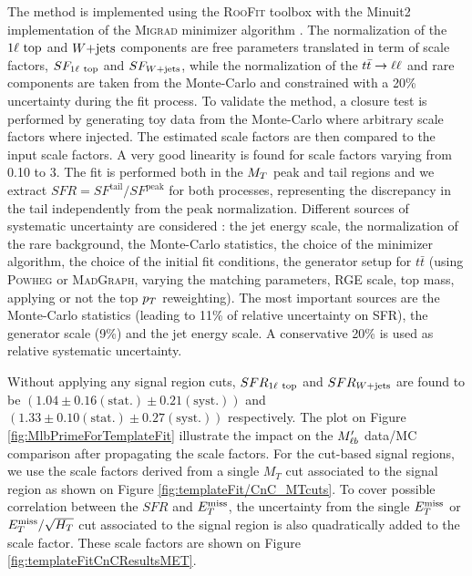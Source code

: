    The method is implemented using the \textsc{RooFit} toolbox  with the Minuit2
    implementation of the \textsc{Migrad} minimizer algorithm . The normalization
    of the $1\ell~\text{top}$ and $\text{$W$+jets}$ components are free parameters translated in term
    of scale factors, $SF_{1\ell~\text{top}}$ and $SF_{\text{$W$+jets}}$, while the normalization of
    the $t\bar{t} \rightarrow \ell \ell$ and rare components are taken from the Monte-Carlo and constrained
    with a 20\% uncertainty during the fit process. To validate the method, a closure test
    is performed by generating toy data from the Monte-Carlo where arbitrary scale factors
    where injected. The estimated scale factors are then compared to the input scale factors.
    A very good linearity is found for scale factors varying from 0.10 to 3. The fit is
    performed both in the $M_T$ peak and tail regions and we extract $SFR = SF^{\text{tail}}
    / SF^{\text{peak}}$ for both processes, representing the discrepancy in the tail
    independently from the peak normalization. Different sources of systematic uncertainty
    are considered : the jet energy scale, the normalization of the rare background, the
    Monte-Carlo statistics, the choice of the minimizer algorithm, the choice of the
    initial fit conditions, the generator setup for $t\bar{t}$ (using \textsc{Powheg} or
    \textsc{MadGraph}, varying the matching parameters, RGE scale, top mass, applying or
    not the top $p_T$ reweighting). The most important sources are the Monte-Carlo statistics
    (leading to 11\% of relative uncertainty on SFR), the generator scale (9\%) and the jet
    energy scale. A conservative 20\% is used as relative systematic uncertainty.

    Without applying any signal region cuts, $SFR_{1\ell~\text{top}}$ and $SFR_{\text{$W$+jets}}$ are found
    to be $(1.04 \pm 0.16 (\text{stat.}) \pm 0.21 (\text{syst.}))$ and $(1.33 \pm 0.10
    (\text{stat.}) \pm 0.27 (\text{syst.}) )$ respectively. The plot on Figure \ref{fig:MlbPrimeForTemplateFit}
    illustrate the impact on the $M'_{\ell b}$ data/MC comparison after propagating the scale
    factors. For the cut-based signal regions, we use the scale factors derived from a
    single $M_T$ cut associated to the signal region as shown on Figure \ref{fig:templateFit/CnC_MTcuts}.
    To cover possible correlation between the $SFR$ and $E_T^\text{miss}$, the uncertainty from the
    single $E_T^\text{miss}$ or $E_T^\text{miss}/\sqrt{H_T}$ cut associated to the signal region is also
    quadratically added to the scale factor. These scale factors are shown on Figure \ref{fig:templateFitCnCResultsMET}.

